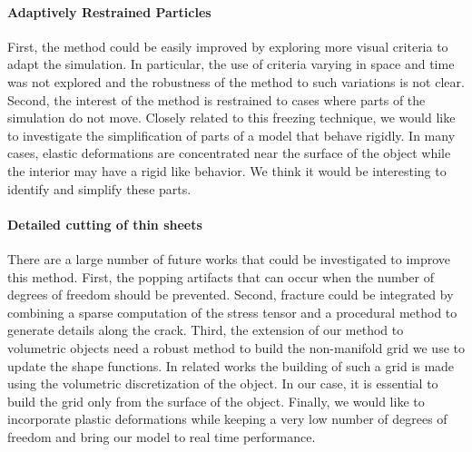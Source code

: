 \paragraph{Adaptively Restrained Particles} First, the method could be easily improved by exploring more visual criteria to adapt the simulation. In particular, the use of criteria varying in space and time was not explored and the robustness of the method to such variations is not clear. Second, the interest of the method is restrained to cases where parts of the simulation do not move. Closely related to this freezing technique, we would like to investigate the simplification of parts of a model that behave rigidly. In many cases, elastic deformations are concentrated near the surface of the object while the interior may have a rigid like behavior. We think it would be interesting to identify and simplify these parts.

\paragraph{Detailed cutting of thin sheets} There are a large number of future works that could be investigated to improve this method. First, the popping artifacts that can occur when the number of degrees of freedom should be prevented. Second, fracture could be integrated by combining a sparse computation of the stress tensor and a procedural method to generate details along the crack. Third, the extension of our method to volumetric objects need a robust method to build the non-manifold grid we use to update the shape functions. In related works the building of such a grid is made using the volumetric discretization of the object. In our case, it is essential to build the grid only from the surface of the object. Finally, we would like to incorporate plastic deformations while keeping a very low number of degrees of freedom and bring our model to real time performance.

